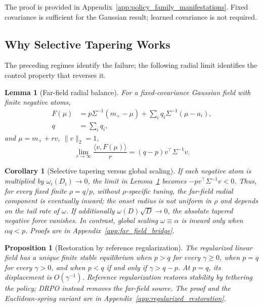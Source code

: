 \documentclass{article}
\theoremstyle{plain}
\newtheorem{proposition}[theorem]{Proposition}
\newtheorem{lemma}[theorem]{Lemma}
\newtheorem{corollary}[theorem]{Corollary}
\theoremstyle{definition}
\theoremstyle{remark}
\begin{document}
The proof is provided in
Appendix~\ref{app:policy_family_manifestations}.
Fixed covariance is sufficient for the Gaussian result; learned covariance is
not required.

\subsection{Why Selective Tapering Works}
\label{sec:selective_tapering_bridge}

The preceding regimes identify the failure; the following radial limit
identifies the control property that reverses it.

\begin{lemma}[Far-field radial balance]
\label{lem:far_field_radial_balance}
For a fixed-covariance Gaussian field with finite negative atoms,
\[
\begin{aligned}
F(\mu)&=p\Sigma^{-1}(m_+-\mu)
 +\sum_iq_i\Sigma^{-1}(\mu-a_i),\\
q&=\sum_iq_i,
\end{aligned}
\]
and \(\mu=m_++rv\), \(\|v\|_2=1\),
\[
\lim_{r\to\infty}\frac{\langle v,F(\mu)\rangle}{r}
=(q-p)v^\top\Sigma^{-1}v.
\]
\end{lemma}

\begin{corollary}[Selective tapering versus global scaling]
\label{cor:selective_vs_global}
If each negative atom is multiplied by
\(\omega_i(D_i)\to0\), the limit in
Lemma~\ref{lem:far_field_radial_balance} becomes
\(-p v^\top\Sigma^{-1}v<0\). Thus, for every fixed finite
\(\rho=q/p\), without \(\rho\)-specific tuning, the far-field radial
component is eventually inward; the onset radius is not uniform in
\(\rho\) and depends on the tail rate of \(\omega\). If additionally
\(\omega(D)\sqrt D\to0\), the absolute tapered negative force vanishes.
In contrast, global scaling \(\omega\equiv\alpha\) is inward only when
\(\alpha q<p\). Proofs are in Appendix~\ref{app:far_field_bridge}.
\end{corollary}

\begin{proposition}[Restoration by reference regularization]
\label{prop:regularized_restoration}
The regularized linear field has a unique finite stable equilibrium when
\(p>q\) for every \(\gamma\ge0\), when \(p=q\) for every \(\gamma>0\),
and when \(p<q\) if and only if \(\gamma>q-p\). At \(p=q\), its
displacement is \(O(\gamma^{-1})\). Reference regularization restores
stability by tethering the policy; DRPO instead removes the far-field
source. The proof and the Euclidean-spring variant are in
Appendix~\ref{app:regularized_restoration}.
\end{proposition}
\end{document}
